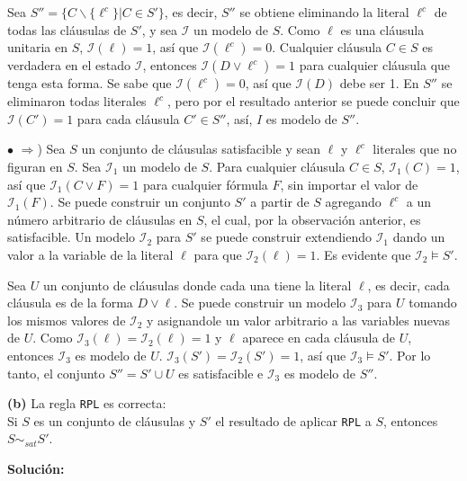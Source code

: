 \documentclass{article}
\begin{document}
\begin{itemize}
Sea $S'' = \{ C \backslash \{ \ell^{c} \} | C \in S' \}$, es decir, $S''$ se obtiene eliminando la literal $\ell^{c}$ de todas las cláusulas de $S'$, y sea $\mathcal{I}$ un modelo de $S$. Como $\ell$ es una cláusula unitaria en $S$, $\mathcal{I} (\ell) = 1$, así que $\mathcal{I} (\ell^{c}) = 0$. Cualquier cláusula $C \in S$ es verdadera en el estado $\mathcal{I}$, entonces $\mathcal{I} (D \vee \ell^{c}) = 1$ para cualquier cláusula que tenga esta forma. Se sabe que $\mathcal{I} (\ell^{c}) = 0$, así que $\mathcal{I} (D)$ debe ser 1. En $S''$ se eliminaron todas literales $\ell^{c}$, pero por el resultado anterior se puede concluir que $\mathcal{I} (C') = 1$ para cada cláusula $C' \in S''$, así, $I$ es modelo de $S''$.

$\bullet$ $\Rightarrow$) Sea $S$ un conjunto de cláusulas satisfacible y sean $\ell$ y $\ell^{c}$ literales que no figuran en $S$. Sea $\mathcal{I}_1$ un modelo de $S$. Para cualquier cláusula $C \in S$, $\mathcal{I}_1 (C)=1$, así que $\mathcal{I}_1 (C \vee F) = 1$ para cualquier fórmula $F$, sin importar el valor de $\mathcal{I}_1 (F)$. Se puede construir un conjunto $S'$ a partir de $S$ agregando $\ell^{c}$ a un número arbitrario de cláusulas en $S$, el cual, por la observación anterior, es satisfacible. Un modelo $\mathcal{I}_2$ para $S'$ se puede construir extendiendo $\mathcal{I}_1$ dando un valor a la variable de la literal $\ell$ para que $\mathcal{I}_2 (\ell) = 1$. Es evidente que $\mathcal{I}_2 \models S'$.

Sea $U$ un conjunto de cláusulas donde cada una tiene la literal $\ell$, es decir, cada cláusula es de la forma $D \vee \ell$. Se puede construir un modelo $\mathcal{I}_3$ para $U$ tomando los mismos valores de $\mathcal{I}_2$ y asignandole un valor arbitrario a las variables nuevas de $U$. Como $\mathcal{I}_3 (\ell) = \mathcal{I}_2 (\ell) = 1$ y $\ell$ aparece en cada cláusula de $U$, entonces $\mathcal{I}_3$ es modelo de $U$. $\mathcal{I}_3 (S') = \mathcal{I}_2 (S') = 1$, así que $\mathcal{I}_3 \models S'$. Por lo tanto, el conjunto $S'' = S' \cup U$ es satisfacible e $\mathcal{I}_3$ es modelo de $S''$.


\textbf{(b)} La regla \texttt{RPL} es correcta:\\Si $S$ es un conjunto de cláusulas y $S'$ el resultado de aplicar \texttt{RPL} a $S$, entonces $S \sim_{sat} S'$.

\textbf{Solución:}


\end{itemize}
\end{document}
